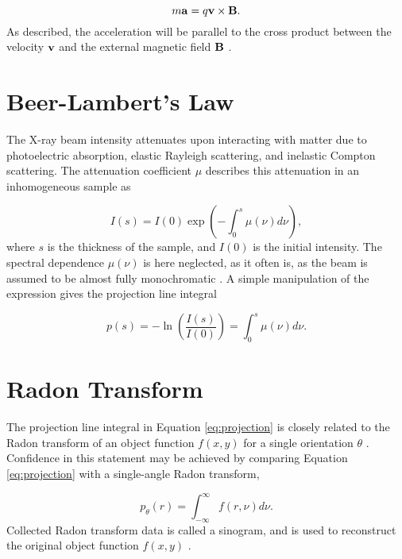 \begin{equation}\label{eq:Lorentz_force}
    m\bm{\mathrm{a}} = q \bm{\mathrm{v}} \times \bm{\mathrm{B}}.
\end{equation}
As described, the acceleration will be parallel to the cross product between the velocity $\bm{\mathrm{v}}$ and the external magnetic field $\bm{\mathrm{B}}$ \cite{}. %


\section{Beer-Lambert's Law}
The X-ray beam intensity attenuates upon interacting with matter due to photoelectric absorption, elastic Rayleigh scattering, and inelastic Compton scattering.
The attenuation coefficient $\mu$ describes this attenuation in an inhomogeneous sample as

\begin{equation}
    I(s) = I(0) \exp(- \int_{0}^{s} \mu(\nu) d\nu),
\end{equation}
\noindent
where $s$ is the thickness of the sample, and $I(0)$ is the initial intensity. The spectral dependence $\mu(\nu)$ is here neglected, as it often is, as the beam is assumed to be almost fully monochromatic \cite{buzug2009computed}.
A simple manipulation of the expression gives the projection line integral

\begin{equation}\label{eq:projection}
    p(s) = -\ln(\frac{I(s)}{I(0)} ) = \int_{0}^{s} \mu(\nu) d\nu.
\end{equation}

\section{Radon Transform}
The projection line integral in Equation \eqref{eq:projection} is closely related to the Radon transform of an object function $f(x,y)$ for a single orientation $\theta$ \cite{zeng2010medical}.
Confidence in this statement may be achieved by comparing Equation \eqref{eq:projection} with a single-angle Radon transform,

\begin{equation}\label{eq:Radon_transform}
    p_{\theta}(r) = \int_{-\infty}^{\infty} f(r,\nu) d\nu.
\end{equation}
Collected Radon transform data is called a sinogram, and is used to reconstruct the original object function $f(x,y)$ \cite{gonzalez2018digital}.

